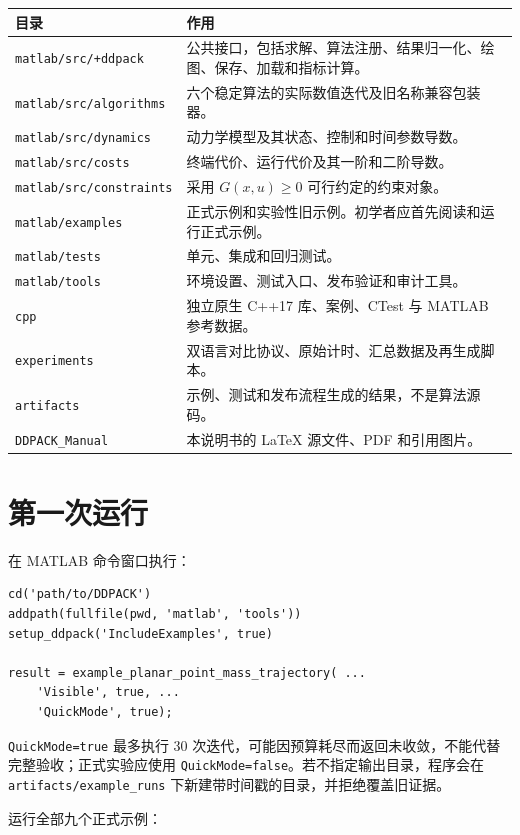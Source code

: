 \documentclass[UTF8,zihao=-4,openany,fontset=fandol]{ctexbook}
\newcommand{\code}[1]{\nolinkurl{#1}}
\begin{document}
\begin{longtable}{p{}p{}}
\toprule
目录 & 作用\\
\midrule
\endhead
\code{matlab/src/+ddpack} & 公共接口，包括求解、算法注册、结果归一化、绘图、保存、加载和指标计算。\\
\code{matlab/src/algorithms} & 六个稳定算法的实际数值迭代及旧名称兼容包装器。\\
\code{matlab/src/dynamics} & 动力学模型及其状态、控制和时间参数导数。\\
\code{matlab/src/costs} & 终端代价、运行代价及其一阶和二阶导数。\\
\code{matlab/src/constraints} & 采用 $G(x,u)\ge 0$ 可行约定的约束对象。\\
\code{matlab/examples} & 正式示例和实验性旧示例。初学者应首先阅读和运行正式示例。\\
\code{matlab/tests} & 单元、集成和回归测试。\\
\code{matlab/tools} & 环境设置、测试入口、发布验证和审计工具。\\
\code{cpp} & 独立原生 C++17 库、案例、CTest 与 MATLAB 参考数据。\\
\code{experiments} & 双语言对比协议、原始计时、汇总数据及再生成脚本。\\
\code{artifacts} & 示例、测试和发布流程生成的结果，不是算法源码。\\
\code{DDPACK_Manual} & 本说明书的 LaTeX 源文件、PDF 和引用图片。\\
\bottomrule
\end{longtable}

\section{第一次运行}

在 MATLAB 命令窗口执行：

\begin{lstlisting}
cd('path/to/DDPACK')
addpath(fullfile(pwd, 'matlab', 'tools'))
setup_ddpack('IncludeExamples', true)

result = example_planar_point_mass_trajectory( ...
    'Visible', true, ...
    'QuickMode', true);
\end{lstlisting}

\code{QuickMode=true} 最多执行 30 次迭代，可能因预算耗尽而返回未收敛，不能代替完整验收；正式实验应使用
\code{QuickMode=false}。若不指定输出目录，程序会在
\code{artifacts/example_runs} 下新建带时间戳的目录，并拒绝覆盖旧证据。

运行全部九个正式示例：
\end{document}
